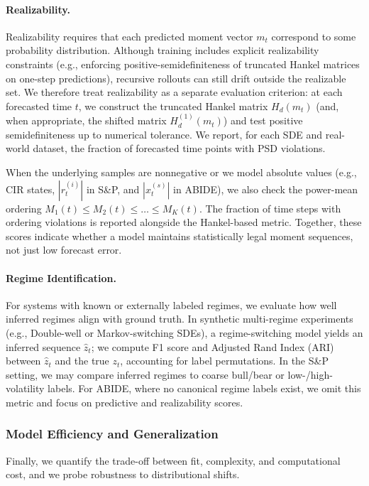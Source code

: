 \documentclass[journal, onecolumn]{IEEEtran}
\begin{document}
\paragraph{Realizability.}
Realizability requires that each predicted moment vector \(m_t\) correspond to
some probability distribution. Although training includes explicit
realizability constraints (e.g., enforcing positive-semidefiniteness of
truncated Hankel matrices on one-step predictions), recursive rollouts can
still drift outside the realizable set. We therefore treat realizability as a
separate evaluation criterion: at each forecasted time \(t\), we construct the
truncated Hankel matrix \(H_d(m_t)\) (and, when appropriate, the shifted
matrix \(H_d^{(1)}(m_t)\)) and test positive semidefiniteness up to numerical
tolerance. We report, for each SDE and real-world dataset, the fraction of
forecasted time points with PSD violations.

When the underlying samples are nonnegative or we model absolute values
(e.g., CIR states, \(|r_t^{(i)}|\) in S\&P, and \(|x_t^{(s)}|\) in ABIDE), we
also check the power-mean ordering
\(M_1(t) \le M_2(t) \le \dots \le M_K(t)\). The fraction of time steps with
ordering violations is reported alongside the Hankel-based metric. Together,
these scores indicate whether a model maintains statistically legal moment
sequences, not just low forecast error.

\paragraph{Regime Identification.}
For systems with known or externally labeled regimes, we evaluate how well
inferred regimes align with ground truth. In synthetic multi-regime experiments
(e.g., Double-well or Markov-switching SDEs), a regime-switching model yields
an inferred sequence \(\hat z_t\); we compute F1 score and Adjusted Rand Index
(ARI) between \(\hat z_t\) and the true \(z_t\), accounting for label
permutations. In the S\&P setting, we may compare inferred regimes to coarse
bull/bear or low-/high-volatility labels. For ABIDE, where no canonical regime
labels exist, we omit this metric and focus on predictive and realizability
scores.

\subsubsection{Model Efficiency and Generalization}

Finally, we quantify the trade-off between fit, complexity, and computational
cost, and we probe robustness to distributional shifts.
\end{document}
